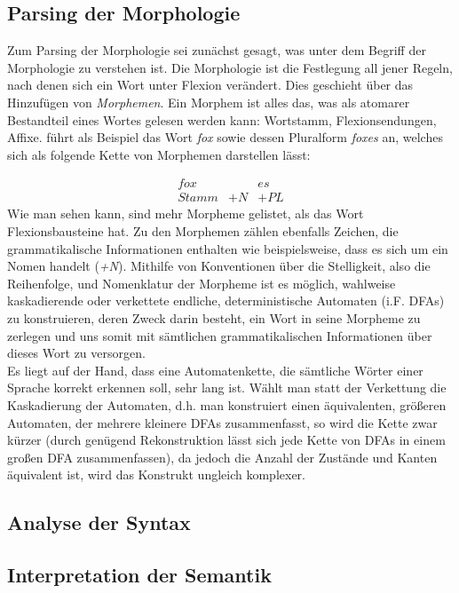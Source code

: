 \documentclass[12pt,twoside]{article}
\theoremstyle{plain}
\theoremstyle{definition}
\theoremstyle{remark}
\begin{document}
	\subsection{Parsing der Morphologie}
	\label{ssec:morph}
Zum Parsing der Morphologie sei zunächst gesagt, was unter dem Begriff der Morphologie zu verstehen ist.
Die Morphologie ist die Festlegung all jener Regeln, nach denen sich ein Wort unter Flexion verändert.
Dies geschieht über das Hinzufügen von \textit{Morphemen}.
Ein Morphem ist alles das, was als atomarer Bestandteil eines Wortes gelesen werden kann: Wortstamm, Flexionsendungen, Affixe.
\cite{Jur2009} führt als Beispiel das Wort \textit{fox} sowie dessen Pluralform \textit{foxes} an, welches sich als folgende Kette von Morphemen darstellen lässt:\\
{\begin{equation*}
\begin{array}{ccc}
	fox & & es	\\
	Stamm & +N & +PL
\end{array}
\end{equation*}
Wie man sehen kann, sind mehr Morpheme gelistet, als das Wort Flexionsbausteine hat.
Zu den Morphemen zählen ebenfalls Zeichen, die grammatikalische Informationen enthalten wie beispielsweise, dass es sich um ein Nomen handelt (\textit{+N}).
Mithilfe von Konventionen über die Stelligkeit, also die Reihenfolge, und Nomenklatur der Morpheme ist es möglich, wahlweise kaskadierende oder verkettete endliche, deterministische Automaten (i.F. DFAs) zu konstruieren, deren Zweck darin besteht, ein Wort in seine Morpheme zu zerlegen und uns somit mit sämtlichen grammatikalischen Informationen über dieses Wort zu versorgen.\\
Es liegt auf der Hand, dass eine Automatenkette, die sämtliche Wörter einer Sprache korrekt erkennen soll, sehr lang ist.
Wählt man statt der Verkettung die Kaskadierung der Automaten, d.h. man konstruiert einen äquivalenten, größeren Automaten, der mehrere kleinere DFAs zusammenfasst, so wird die Kette zwar kürzer (durch genügend Rekonstruktion lässt sich jede Kette von DFAs in einem großen DFA zusammenfassen), da jedoch die Anzahl der Zustände und Kanten äquivalent ist, wird das Konstrukt ungleich komplexer.
	\subsection{Analyse der Syntax}
	\label{ssec:syntax}
	\subsection{Interpretation der Semantik}
	\label{sec:sem}
}
\end{document}
